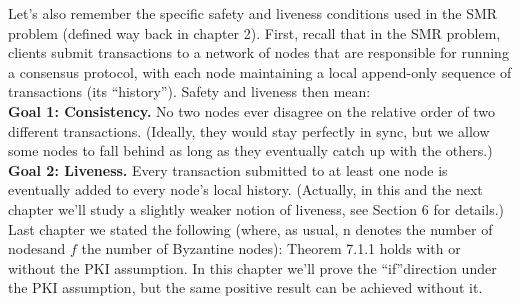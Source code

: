 Let’s also remember the specific safety and liveness conditions used in the SMR problem
(defined way back in chapter 2). First, recall that in the SMR problem, clients submit
 transactions to a network of nodes that are responsible for running a consensus protocol,
with each node maintaining a local append-only sequence of transactions (its “history”).
Safety and liveness then mean:\\

\noindent
\textbf{Goal 1: Consistency.}
No two nodes ever disagree on the relative order of two different transactions. (Ideally, they would stay perfectly in sync, but we allow 
some nodes to fall behind as long as they eventually catch up with the others.)\\

\noindent
\textbf{Goal 2: Liveness.} 
Every transaction submitted to at least one node is eventually added to every node’s local history. (Actually, in this and the next 
chapter we’ll study a slightly weaker notion of liveness, see Section 6 for details.)\\Last chapter we stated the following (where, as 
usual, n denotes the number of nodesand $f$ the number of Byzantine nodes):
Theorem 7.1.1 holds with or without the PKI assumption. In this chapter we’ll prove the “if”direction under the PKI assumption, but the 
same positive result can be achieved without it.\\

